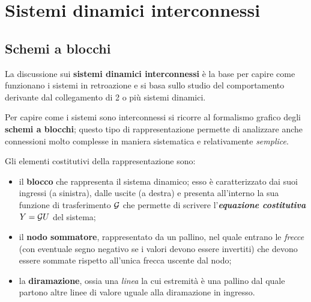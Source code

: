 \chapter{Sistemi dinamici interconnessi}
\section{Schemi a blocchi}
	La discussione sui \textbf{sistemi dinamici interconnessi} è la base per capire come funzionano i sistemi in retroazione e si basa sullo studio del comportamento derivante dal collegamento di 2 o più sistemi dinamici.
	
	Per capire come i sistemi sono interconnessi si ricorre al formalismo grafico degli \textbf{schemi a blocchi}; questo tipo di rappresentazione permette di analizzare anche connessioni molto complesse in maniera sistematica e relativamente \textit{semplice}.
	
	Gli elementi costitutivi della rappresentazione sono:
	\begin{itemize}
		\item il \textbf{blocco} che rappresenta il sistema dinamico; esso è caratterizzato dai suoi ingressi (a sinistra), dalle uscite (a destra) e presenta all'interno la sua funzione di trasferimento $\mathcal G$ che permette di scrivere l'\textbf{\textit{equazione costitutiva}} $Y = \mathcal G U$ del sistema;
		\item il \textbf{nodo sommatore}, rappresentato da un pallino, nel quale entrano le \textit{frecce} (con eventuale segno negativo se i valori devono essere invertiti) che devono essere sommate rispetto all'unica frecca uscente dal nodo;
		\item la \textbf{diramazione}, ossia una \textit{linea} la cui estremità è una pallino dal quale partono altre linee di valore uguale alla diramazione in ingresso.
	\end{itemize}
	
